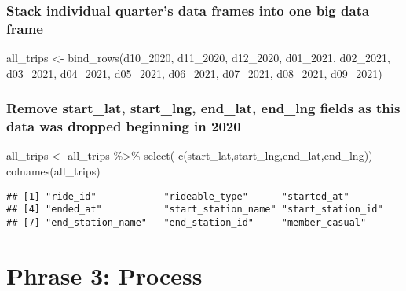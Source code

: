 \documentclass[
]{article}
\newenvironment{Shaded}{\begin{snugshade}}{\end{snugshade}}
\newcommand{\FunctionTok}[1]{\textcolor[rgb]{0.00,0.00,0.00}{#1}}
\newcommand{\NormalTok}[1]{#1}
\newcommand{\OtherTok}[1]{\textcolor[rgb]{0.56,0.35,0.01}{#1}}
\newcommand{\SpecialCharTok}[1]{\textcolor[rgb]{0.00,0.00,0.00}{#1}}
\begin{document}
\hypertarget{stack-individual-quarters-data-frames-into-one-big-data-frame}{%
\subsubsection{Stack individual quarter's data frames into one big data
frame}\label{stack-individual-quarters-data-frames-into-one-big-data-frame}}

\begin{Shaded}
\begin{Highlighting}[]
\NormalTok{all\_trips }\OtherTok{\textless{}{-}} \FunctionTok{bind\_rows}\NormalTok{(d10\_2020, d11\_2020, d12\_2020, d01\_2021, d02\_2021, d03\_2021, d04\_2021, d05\_2021, d06\_2021, d07\_2021, d08\_2021, d09\_2021)}
\end{Highlighting}
\end{Shaded}

\hypertarget{remove-start_lat-start_lng-end_lat-end_lng-fields-as-this-data-was-dropped-beginning-in-2020}{%
\subsubsection{Remove start\_lat, start\_lng, end\_lat, end\_lng fields
as this data was dropped beginning in
2020}\label{remove-start_lat-start_lng-end_lat-end_lng-fields-as-this-data-was-dropped-beginning-in-2020}}

\begin{Shaded}
\begin{Highlighting}[]
\NormalTok{all\_trips }\OtherTok{\textless{}{-}}\NormalTok{ all\_trips }\SpecialCharTok{\%\textgreater{}\%}  
  \FunctionTok{select}\NormalTok{(}\SpecialCharTok{{-}}\FunctionTok{c}\NormalTok{(start\_lat,start\_lng,end\_lat,end\_lng))}
\FunctionTok{colnames}\NormalTok{(all\_trips)}
\end{Highlighting}
\end{Shaded}

\begin{verbatim}
## [1] "ride_id"            "rideable_type"      "started_at"        
## [4] "ended_at"           "start_station_name" "start_station_id"  
## [7] "end_station_name"   "end_station_id"     "member_casual"
\end{verbatim}

\hypertarget{phrase-3-process}{%
\section{Phrase 3: Process}\label{phrase-3-process}}
\end{document}
